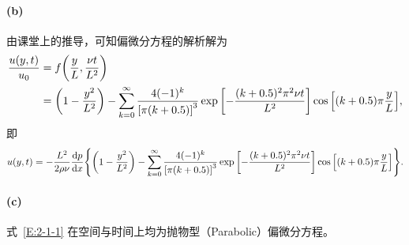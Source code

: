 \paragraph{(b)}
由课堂上的推导，可知偏微分方程的解析解为
\begin{equation*}
    \begin{aligned}
        \frac{u(y, t)}{u_0} &= f\qty(\frac{y}{L}, \frac{\nu t}{L^2}) \\
                            &= \qty(1 - \frac{y^2}{L^2}) - \sum_{k=0}^\infty\frac{4(-1)^k}{\qty[\pi(k+0.5)]^3}\exp\qty[-\frac{(k+0.5)^2\pi^2\nu t}{L^2}]\cos\qty[(k+0.5)\pi\frac{y}{L}],
    \end{aligned}
\end{equation*}
即
\begin{equation*}
    u(y, t) = -\frac{L^2}{2\rho\nu}\dv{p}{x} \qty{
        \qty(1 - \frac{y^2}{L^2}) - \sum_{k=0}^\infty\frac{4(-1)^k}{\qty[\pi(k+0.5)]^3}\exp\qty[-\frac{(k+0.5)^2\pi^2\nu t}{L^2}]\cos\qty[(k+0.5)\pi\frac{y}{L}]
    }.
\end{equation*}

\paragraph{(c)}
式~\eqref{E:2-1-1} 在空间与时间上均为抛物型（Parabolic）偏微分方程。




